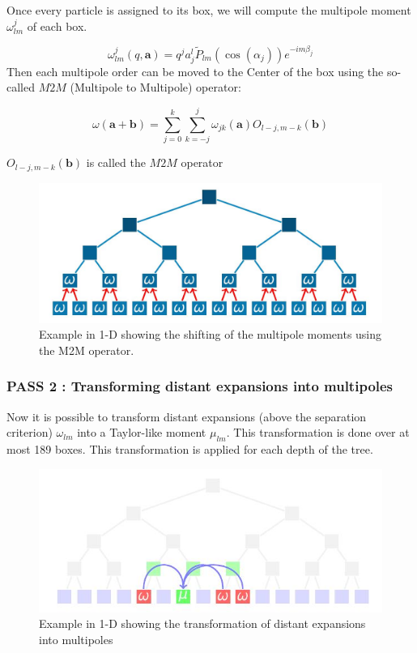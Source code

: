 \documentclass[11pt,twoside,a4paper]{report}
\begin{document}
    Once every particle is assigned to its box, we will compute the multipole moment $\omega_{lm}^j$ of each box.
    
    \begin{equation}
    \omega_{lm}^{j}(q,\textbf{a}) = q^j a_j^l \widetilde{P}_{lm}(\cos(\alpha_j))e^{-im\beta_j}
    \end{equation}
%
Then each multipole order can be moved to the Center of the box using the so-called $M2M$ (Multipole to Multipole) operator:    
    
    \begin{equation}
    \omega(\textbf{a} + \textbf{b}) = \sum\limits_{j=0}^{k} \sum\limits_{k=-j}^{j} \omega_{jk}(\textbf{a}) O_{l-j,m-k}(\textbf{b})
    \end{equation}

   $O_{l-j,m-k}(\textbf{b})$ is called the $M2M$ operator
   
   \begin{figure}[H]
   \includegraphics[scale=0.4]{ShiftMultipole}
    \centering 
    \caption{Example in 1-D showing the shifting of the multipole moments using the M2M operator. }
    \label{fig:multipole}
   \end{figure}
   
   
   	\subsubsection{PASS 2 : Transforming distant expansions into multipoles}
   	
   	Now it is possible to transform distant expansions (above the separation criterion) $\omega_{lm}$ into a Taylor-like moment $\mu_{lm}$. This transformation is done over at most 189 boxes. This transformation is applied for each depth of the tree.  
   	
   	
 \begin{figure}[H]
 	\label{fig:M2L}
   \includegraphics[scale=0.8]{transformExpansions1}
    \centering 
    \caption{Example in 1-D showing the transformation of distant expansions into multipoles}
    
   \end{figure}
   
\end{document}
